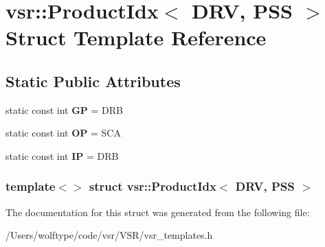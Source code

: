 \hypertarget{structvsr_1_1_product_idx_3_01_d_r_v_00_01_p_s_s_01_4}{\section{vsr\-:\-:Product\-Idx$<$ D\-R\-V, P\-S\-S $>$ Struct Template Reference}
\label{structvsr_1_1_product_idx_3_01_d_r_v_00_01_p_s_s_01_4}
}
\subsection*{Static Public Attributes}
\begin{DoxyCompactItemize}
\item 
\hypertarget{structvsr_1_1_product_idx_3_01_d_r_v_00_01_p_s_s_01_4_ab9a550de90ef1cb08c6bfe771ae13d22}{static const int {\bfseries G\-P} = D\-R\-B}\label{structvsr_1_1_product_idx_3_01_d_r_v_00_01_p_s_s_01_4_ab9a550de90ef1cb08c6bfe771ae13d22}

\item 
\hypertarget{structvsr_1_1_product_idx_3_01_d_r_v_00_01_p_s_s_01_4_a08cef55cef715b36a803eb6785430a82}{static const int {\bfseries O\-P} = S\-C\-A}\label{structvsr_1_1_product_idx_3_01_d_r_v_00_01_p_s_s_01_4_a08cef55cef715b36a803eb6785430a82}

\item 
\hypertarget{structvsr_1_1_product_idx_3_01_d_r_v_00_01_p_s_s_01_4_a5b52272c6943be4385c46d841efc40ae}{static const int {\bfseries I\-P} = D\-R\-B}\label{structvsr_1_1_product_idx_3_01_d_r_v_00_01_p_s_s_01_4_a5b52272c6943be4385c46d841efc40ae}

\end{DoxyCompactItemize}
\subsubsection*{template$<$$>$ struct vsr\-::\-Product\-Idx$<$ D\-R\-V, P\-S\-S $>$}



The documentation for this struct was generated from the following file\-:\begin{DoxyCompactItemize}
\item 
/\-Users/wolftype/code/vsr/\-V\-S\-R/vsr\-\_\-templates.\-h\end{DoxyCompactItemize}
